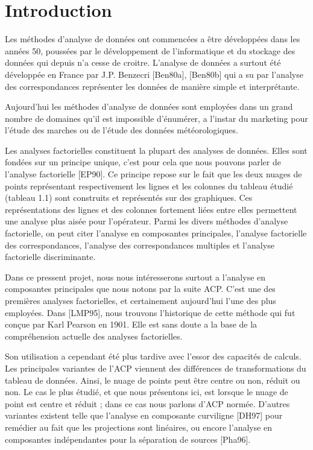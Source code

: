 \documentclass{article}
\begin{document}
\tableofcontents

\newpage

\section{Introduction}

Les méthodes d'analyse de données ont commencées a être développées dans les années 50, poussées par le développement de l'informatique et du stockage des données qui depuis n'a cesse de croitre. L'analyse de données a surtout été développée en France par J.P. Benzecri [Ben80a], [Ben80b] qui a su par l'analyse des correspondances représenter les données de manière simple et interprétante.
\newline

Aujourd'hui les méthodes d'analyse de données sont employées dans un grand nombre de domaines qu'il est impossible d'énumérer, a l'instar du marketing pour l'étude des marches ou de l'étude des données météorologiques.
\newline

Les analyses factorielles constituent la plupart des analyses de données. Elles sont fondées sur un principe unique, c'est pour cela que nous pouvons parler de l'analyse factorielle [EP90]. Ce principe repose sur le fait que les deux nuages de points représentant respectivement les lignes et les colonnes du tableau étudié (tableau 1.1) sont construits et représentés sur des graphiques. Ces représentations des lignes et des colonnes fortement liées entre elles permettent une analyse plus aisée pour l'opérateur. Parmi les divers méthodes d'analyse factorielle, on peut citer l'analyse en composantes principales, l'analyse factorielle des correspondances, l'analyse des correspondances multiples et l'analyse factorielle discriminante.
\newline

Dans ce pressent projet, nous nous intéresserons surtout a l'analyse en composantes principales que nous notons par la suite ACP. C'est une des premières analyses factorielles, et certainement aujourd'hui l'une des plus employées. Dans [LMP95], nous trouvons l'historique de cette méthode qui fut conçue par Karl Pearson en 1901. Elle est sans doute a la base de la compréhension actuelle des analyses factorielles.
\newline

Son utilisation a cependant été plus tardive avec l'essor des capacités de calculs. Les principales variantes de l'ACP viennent des différences de transformations du tableau de données. Ainsi, le nuage de points peut être centre ou non, réduit ou non.
Le cas le plus étudié, et que nous présentons ici, est lorsque le nuage de point est centre et réduit ; dans ce cas nous parlons d'ACP normée. D'autres variantes existent telle que l'analyse en composante curviligne [DH97] pour remédier au fait que les projections sont linéaires, ou encore l'analyse en composantes indépendantes pour la séparation de sources [Pha96].
\end{document}
